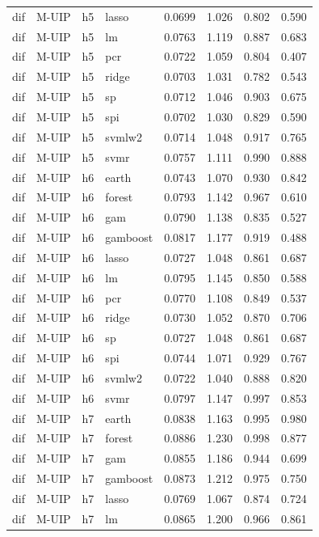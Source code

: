 \begin{ThreePartTable}
\begin{longtable}[t]{llclcccc}
dif & M-UIP & h5 & lasso & 0.0699 & 1.026 & 0.802 & 0.590\\
dif & M-UIP & h5 & lm & 0.0763 & 1.119 & 0.887 & 0.683\\
dif & M-UIP & h5 & pcr & 0.0722 & 1.059 & 0.804 & 0.407\\
dif & M-UIP & h5 & ridge & 0.0703 & 1.031 & 0.782 & 0.543\\
dif & M-UIP & h5 & sp & 0.0712 & 1.046 & 0.903 & 0.675\\
dif & M-UIP & h5 & spi & 0.0702 & 1.030 & 0.829 & 0.590\\
dif & M-UIP & h5 & svmlw2 & 0.0714 & 1.048 & 0.917 & 0.765\\
dif & M-UIP & h5 & svmr & 0.0757 & 1.111 & 0.990 & 0.888\\
\addlinespace
dif & M-UIP & h6 & earth & 0.0743 & 1.070 & 0.930 & 0.842\\
dif & M-UIP & h6 & forest & 0.0793 & 1.142 & 0.967 & 0.610\\
dif & M-UIP & h6 & gam & 0.0790 & 1.138 & 0.835 & 0.527\\
dif & M-UIP & h6 & gamboost & 0.0817 & 1.177 & 0.919 & 0.488\\
dif & M-UIP & h6 & lasso & 0.0727 & 1.048 & 0.861 & 0.687\\
dif & M-UIP & h6 & lm & 0.0795 & 1.145 & 0.850 & 0.588\\
dif & M-UIP & h6 & pcr & 0.0770 & 1.108 & 0.849 & 0.537\\
dif & M-UIP & h6 & ridge & 0.0730 & 1.052 & 0.870 & 0.706\\
dif & M-UIP & h6 & sp & 0.0727 & 1.048 & 0.861 & 0.687\\
dif & M-UIP & h6 & spi & 0.0744 & 1.071 & 0.929 & 0.767\\
dif & M-UIP & h6 & svmlw2 & 0.0722 & 1.040 & 0.888 & 0.820\\
dif & M-UIP & h6 & svmr & 0.0797 & 1.147 & 0.997 & 0.853\\
\addlinespace
dif & M-UIP & h7 & earth & 0.0838 & 1.163 & 0.995 & 0.980\\
dif & M-UIP & h7 & forest & 0.0886 & 1.230 & 0.998 & 0.877\\
dif & M-UIP & h7 & gam & 0.0855 & 1.186 & 0.944 & 0.699\\
dif & M-UIP & h7 & gamboost & 0.0873 & 1.212 & 0.975 & 0.750\\
dif & M-UIP & h7 & lasso & 0.0769 & 1.067 & 0.874 & 0.724\\
dif & M-UIP & h7 & lm & 0.0865 & 1.200 & 0.966 & 0.861\\

\end{longtable}
\end{ThreePartTable}
